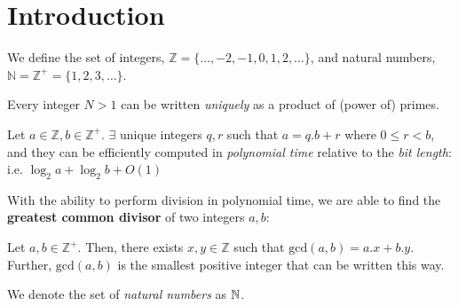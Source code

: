 \setcounter{chapter}{3}
\setcounter{lecture}{18}
\chapter{Introduction}
We define the set of integers, \( \mathbb{Z} = \{ \ldots, -2, -1, 0, 1, 2, \ldots \} \), 
and natural numbers, \( \mathbb{N} = \mathbb{Z}^+ = \{ 1, 2, 3, \ldots \} \).

\begin{theorem}\label{ProductOfPrimes}
	Every integer \( N > 1 \) can be written \emph{uniquely} as
	a product of (power of) primes.
\end{theorem}

\begin{lemma}\label{DivisionWithRemainder}
	Let \( a \in \mathbb{Z}, b \in \mathbb{Z}^+ \). $\exists$ unique
	integers $q, r$ such that \( a = q . b + r \) where \( 0 \leq r < b \),    
	and they can be efficiently computed in \emph{polynomial time}
	relative to the \emph{bit length}: i.e. \( \log_2 a + \log_2 b + O(1) \) 
\end{lemma}

With the ability to perform division in polynomial time, we are able
to find the \textbf{greatest common divisor} of two integers $a, b$:

\begin{definition}\label{gcd}
	Let \( a, b \in \mathbb{Z}^+ \). Then, there exists \( x, y \in 
	\mathbb{Z} \) such that \( \text{gcd}(a, b) = a.x  + b.y \).   
	Further, \( \text{gcd}(a, b) \) is the smallest positive integer
	that can be written this way. 
\end{definition}

\begin{definition}\label{def}
	We denote the set of \emph{natural numbers} as \(\mathbb{\MakeUppercase{n}} \).
\end{definition}


